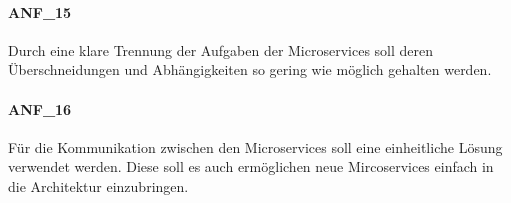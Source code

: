 \paragraph{ANF\_15}
\label{ANF_15}
Durch eine klare Trennung der Aufgaben der Microservices soll deren Überschneidungen und Abhängigkeiten so gering wie möglich gehalten werden.

\paragraph{ANF\_16}
\label{ANF_16}
Für die Kommunikation zwischen den Microservices soll eine einheitliche Lösung verwendet werden.
Diese soll es auch ermöglichen neue Mircoservices einfach in die Architektur einzubringen.

